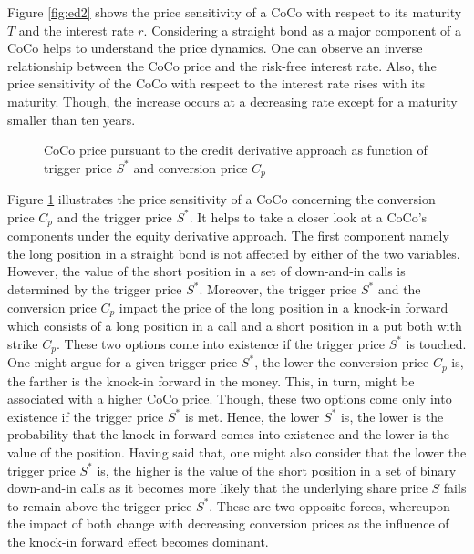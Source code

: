 Figure \ref{fig:ed2} shows the price sensitivity of a CoCo with respect to its maturity $T$ and the interest rate $r$. Considering a straight bond as a major component of a CoCo helps to understand the price dynamics. One can observe an inverse relationship between the CoCo price and the risk-free interest rate. Also, the price sensitivity of the CoCo with respect to the interest rate rises with its maturity. Though, the increase occurs at a decreasing rate except for a maturity smaller than ten years. \\
 
\begin{figure}
\centering
    \caption[CoCo price pursuant to the equity derivative approach as function of trigger price and conversion price]{CoCo price pursuant to the credit derivative approach as function of trigger price $S^*$ and conversion price $C_p$}
  \label{fig:ed3}
  \end{figure}
  
Figure \ref{fig:ed3} illustrates the price sensitivity of a CoCo concerning the conversion price $C_p$ and the trigger price $S^*$. It helps to take a closer look at a CoCo's components under the equity derivative approach. The first component namely the long position in a straight bond is not affected by either of the two variables. However, the value of the short position in a set of down-and-in calls is determined by the trigger price $S^*$. Moreover, the trigger price $S^*$ and the conversion price $C_p$ impact the price of the long position in a knock-in forward which consists of a long position in a call and a short position in a put both with strike $C_p$. These two options come into existence if the trigger price $S^*$ is touched. One might argue for a given trigger price $S^*$, the lower the conversion price $C_p$ is, the farther is the knock-in forward in the money. This, in turn, might be associated with a higher CoCo price. Though, these two options come only into existence if the trigger price $S^*$ is met. Hence, the lower $S^*$ is, the lower is the probability that the knock-in forward comes into existence and the lower is the value of the position. Having said that, one might also consider that the lower the trigger price $S^*$ is, the higher is the value of the short position in a set of binary down-and-in calls as it becomes more likely that the underlying share price $S$ fails to remain above the trigger price $S^*$. These are two opposite forces, whereupon the impact of both change with decreasing conversion prices as the influence of the knock-in forward effect becomes dominant. 

